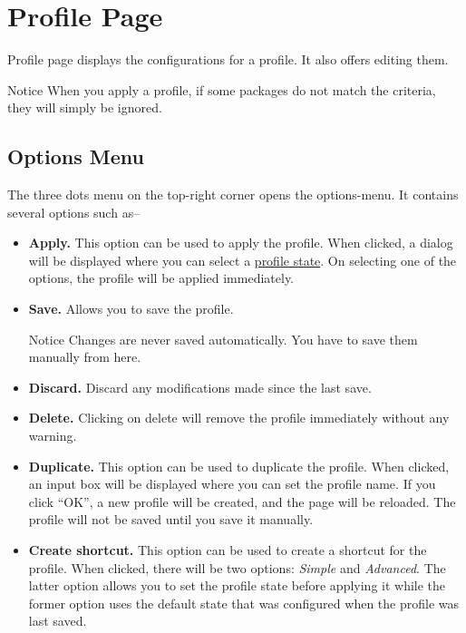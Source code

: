 \section{Profile Page}\label{sec:profile-page}
Profile page displays the configurations for a profile. It also offers editing them.

\begin{tip}{Notice}
    When you apply a profile, if some packages do not match the criteria, they will simply be ignored.
\end{tip}

\subsection{Options Menu}\label{subsec:profile-options-menu}
The three dots menu on the top-right corner opens the options-menu. It contains several options such as--
\begin{itemize}
    \item \textbf{Apply.} This option can be used to apply the profile. When clicked, a dialog will be displayed where
    you can select a \hyperref[subsubsec:profile-state]{profile state}. On selecting one of the options, the profile
    will be applied immediately.
    \item \textbf{Save.} Allows you to save the profile.
    \begin{warning}{Notice}
        Changes are never saved automatically. You have to save them manually from here.
    \end{warning}
    \item \textbf{Discard.} Discard any modifications made since the last save.
    \item \textbf{Delete.} Clicking on delete will remove the profile immediately without any warning.
    \item \textbf{Duplicate.} This option can be used to duplicate the profile. When clicked, an input box will be
    displayed where you can set the profile name. If you click ``OK'', a new profile will be created, and the page will be
    reloaded. The profile will not be saved until you save it manually.
    \item \textbf{Create shortcut.} This option can be used to create a shortcut for the profile. When clicked, there
    will be two options: \textit{Simple} and \textit{Advanced}. The latter option allows you to set the profile state
    before applying it while the former option uses the default state that was configured when the profile was last saved.
\end{itemize}


